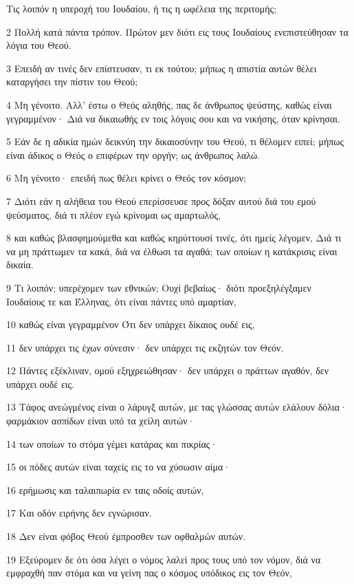 \par Τις λοιπόν η υπεροχή του Ιουδαίου, ή τις η ωφέλεια της περιτομής;
\par 2 Πολλή κατά πάντα τρόπον. Πρώτον μεν διότι εις τους Ιουδαίους ενεπιστεύθησαν τα λόγια του Θεού.
\par 3 Επειδή αν τινές δεν επίστευσαν, τι εκ τούτου; μήπως η απιστία αυτών θέλει καταργήσει την πίστιν του Θεού;
\par 4 Μη γένοιτο. Αλλ' έστω ο Θεός αληθής, πας δε άνθρωπος ψεύστης, καθώς είναι γεγραμμένον· Διά να δικαιωθής εν τοις λόγοις σου και να νικήσης, όταν κρίνησαι.
\par 5 Εάν δε η αδικία ημών δεικνύη την δικαιοσύνην του Θεού, τι θέλομεν ειπεί; μήπως είναι άδικος ο Θεός ο επιφέρων την οργήν; ως άνθρωπος λαλώ.
\par 6 Μη γένοιτο· επειδή πως θέλει κρίνει ο Θεός τον κόσμον;
\par 7 Διότι εάν η αλήθεια του Θεού επερίσσευσε προς δόξαν αυτού διά του εμού ψεύσματος, διά τι πλέον εγώ κρίνομαι ως αμαρτωλός,
\par 8 και καθώς βλασφημούμεθα και καθώς κηρύττουσί τινές, ότι ημείς λέγομεν, Διά τι να μη πράττωμεν τα κακά, διά να έλθωσι τα αγαθά; των οποίων η κατάκρισις είναι δικαία.
\par 9 Τι λοιπόν; υπερέχομεν των εθνικών; Ουχί βεβαίως· διότι προεξηλέγξαμεν Ιουδαίους τε και Έλληνας, ότι είναι πάντες υπό αμαρτίαν,
\par 10 καθώς είναι γεγραμμένον Ότι δεν υπάρχει δίκαιος ουδέ εις,
\par 11 δεν υπάρχει τις έχων σύνεσιν· δεν υπάρχει τις εκζητών τον Θεόν.
\par 12 Πάντες εξέκλιναν, ομού εξηχρειώθησαν· δεν υπάρχει ο πράττων αγαθόν, δεν υπάρχει ουδέ εις.
\par 13 Τάφος ανεώγμένος είναι ο λάρυγξ αυτών, με τας γλώσσας αυτών ελάλουν δόλια· φαρμάκιον ασπίδων είναι υπό τα χείλη αυτών·
\par 14 των οποίων το στόμα γέμει κατάρας και πικρίας·
\par 15 οι πόδες αυτών είναι ταχείς εις το να χύσωσιν αίμα·
\par 16 ερήμωσις και ταλαιπωρία εν ταις οδοίς αυτών,
\par 17 Και οδόν ειρήνης δεν εγνώρισαν.
\par 18 Δεν είναι φόβος Θεού έμπροσθεν των οφθαλμών αυτών.
\par 19 Εξεύρομεν δε ότι όσα λέγει ο νόμος λαλεί προς τους υπό τον νόμον, διά να εμφραχθή παν στόμα και να γείνη πας ο κόσμος υπόδικος εις τον Θεόν,
